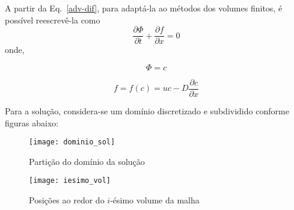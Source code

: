 A partir da Eq.\ \ref{adv-dif}, para adaptá-la ao métodos dos volumes finitos,
é possível reescrevê-la como
\begin{equation}\label{adv-dif-volfin}
    \frac{\partial\Phi}{\partial t} + \frac{\partial f}{\partial x} = 0
\end{equation}
onde,

\noindent
\begin{minipage}{.4\linewidth}
    \begin{equation}
        \Phi = c
    \end{equation}
\end{minipage}%
\begin{minipage}{.6\linewidth}
    \begin{equation}
        f = f(c) = uc - D\frac{\partial c}{\partial x}
    \end{equation}
\end{minipage}

\bigskip
Para a solução, considera-se um domínio discretizado e subdividido conforme
figuras abaixo:
\begin{figure}[h]
    \centering
    \texttt{[image: dominio\_sol]}
    \caption{Partição do domínio da solução}
\end{figure}
\begin{figure}[h]
    \centering
    \texttt{[image: iesimo\_vol]}
    \caption{Posições ao redor do $i$-ésimo volume da malha}
\end{figure}


